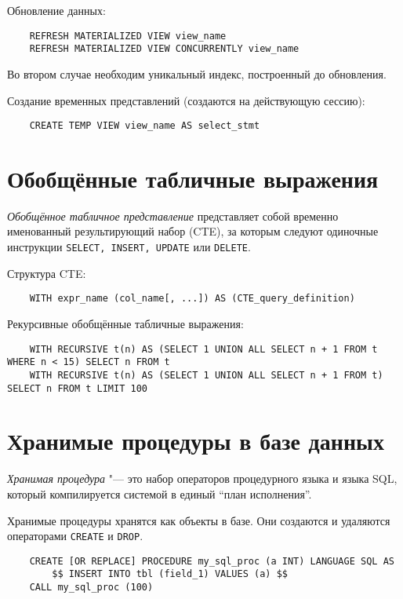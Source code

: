 Обновление данных:
\begin{verbatim}
	REFRESH MATERIALIZED VIEW view_name
	REFRESH MATERIALIZED VIEW CONCURRENTLY view_name
\end{verbatim}
Во втором случае необходим уникальный индекс, построенный до обновления.

Создание временных представлений (создаются на действующую сессию):
\begin{verbatim}
	CREATE TEMP VIEW view_name AS select_stmt
\end{verbatim}

\section{Обобщённые табличные выражения}

\begin{definition}
	\emph{Обобщённое табличное представление} представляет собой временно именованный результирующий набор (CTE), за которым следуют одиночные инструкции \texttt{SELECT, INSERT, UPDATE} или \texttt{DELETE}.
\end{definition}

Структура CTE:
\begin{verbatim}
	WITH expr_name (col_name[, ...]) AS (CTE_query_definition)
\end{verbatim}

Рекурсивные обобщённые табличные выражения:
\begin{verbatim}
	WITH RECURSIVE t(n) AS (SELECT 1 UNION ALL SELECT n + 1 FROM t WHERE n < 15) SELECT n FROM t
	WITH RECURSIVE t(n) AS (SELECT 1 UNION ALL SELECT n + 1 FROM t) SELECT n FROM t LIMIT 100
\end{verbatim}

\section{Хранимые процедуры в базе данных}

\begin{definition}
	\emph{Хранимая процедура} "--- это набор операторов процедурного языка и языка SQL, который компилируется системой в единый ``план исполнения''.
\end{definition}

Хранимые процедуры хранятся как объекты в базе.
Они создаются и удаляются операторами \texttt{CREATE} и \texttt{DROP}.

\begin{verbatim}
	CREATE [OR REPLACE] PROCEDURE my_sql_proc (a INT) LANGUAGE SQL AS
		$$ INSERT INTO tbl (field_1) VALUES (a) $$
	CALL my_sql_proc (100)
\end{verbatim}


